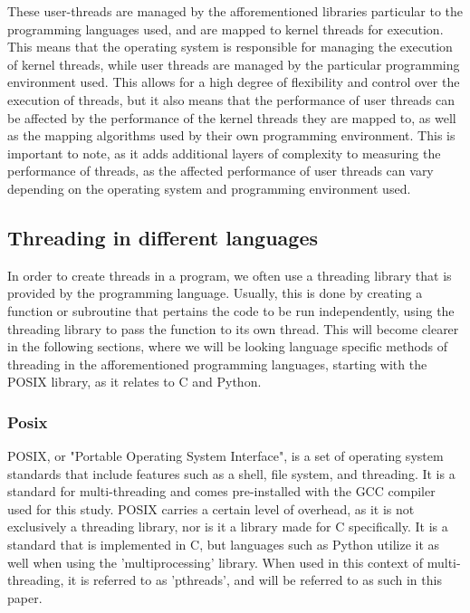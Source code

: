 \documentclass[12pt,a4paper]{article}
\begin{document}
These user-threads are managed by the afforementioned libraries particular to the programming languages used, and are mapped to kernel threads for execution. This means that the operating system is responsible for managing the execution of kernel threads, while user threads are managed by the particular programming environment used. This allows for a high degree of flexibility and control over the execution of threads, but it also means that the performance of user threads can be affected by the performance of the kernel threads they are mapped to, as well as the mapping algorithms used by their own programming environment. This is important to note, as it adds additional layers of complexity to measuring the performance of threads, as the affected performance of user threads can vary depending on the operating system and programming environment used.

\subsection{Threading in different languages}

In order to create threads in a program, we often use a threading library that is provided by the programming language. Usually, this is done by creating a function or subroutine that pertains the code to be run independently, using the threading library to pass the function to its own thread. This will become clearer in the following sections, where we will be looking language specific methods of threading in the afforementioned programming languages, starting with the POSIX library, as it relates to C and Python.

\subsubsection{Posix}

POSIX, or "Portable Operating System Interface"\parencite{GNUPOSIX,POSIXDocs}, is a set of operating system standards that include features such as a shell, file system, and threading. It is a standard for multi-threading and comes pre-installed with the GCC compiler\parencite{GNUPOSIX} used for this study. POSIX carries a certain level of overhead, as it is not exclusively a threading library, nor is it a library made for C specifically. It is a standard that is implemented in C, but languages such as Python utilize it as well when using the 'multiprocessing' library. When used in this context of multi-threading, it is referred to as 'pthreads', and will be referred to as such in this paper.
\end{document}
